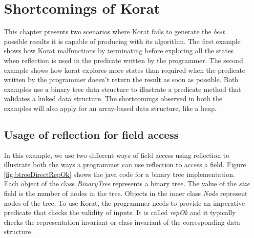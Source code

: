 \chapter{Shortcomings of Korat}
\label{ch:shortcomings-of-korat}
This chapter presents two scenarios where Korat\cite{boyapati2002korat} fails to generate the \emph{best} possible results it is capable of producing with its algorithm. The first example shows how Korat malfunctions by terminating before exploring all the states when reflection is used in the predicate written by the programmer. The second example shows how korat explores more states than required when the predicate written by the programmer doesn’t return the result as soon as possible. Both examples use a binary tree data structure to illustrate a predicate method that validates a linked data structure. The shortcomings observed in both the examples will also apply for an array-based data structure, like a heap.

\section{Usage of reflection for field access}
\label{sec:usage-of-reflection-for-field-access}
In this example, we use two different ways of field access using reflection to illustrate both the ways a programmer can use reflection to access a field. Figure \ref{fig:btreeDirectRepOk} shows the java code for a binary tree implementation. Each object of the class \emph{BinaryTree} represents a binary tree. The value of the \emph{size} field is the number of nodes in the tree. Objects in the inner class \emph{Node} represent nodes of the tree. To use Korat, the programmer needs to provide an imperative predicate that checks the validity of inputs. It is called \emph{repOk} and it typically checks the representation invariant or class invariant of the corresponding data structure. \\

